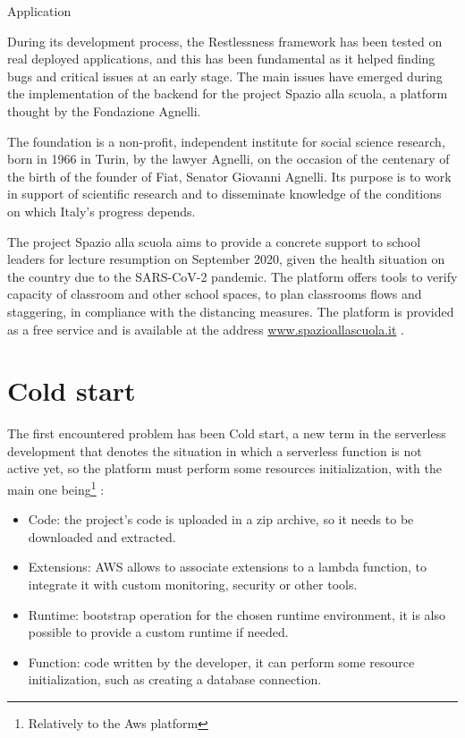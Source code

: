 \begin{chapter}{Application}
    \label{chap:application}

    During its development process, the Restlessness framework has been tested on
    real deployed applications, and this has been fundamental as it helped finding
    bugs and critical issues at an early stage.
    The main issues have emerged during the implementation of the backend for the
    project Spazio alla scuola, a platform thought by the Fondazione Agnelli.

    The foundation is a non-profit, independent institute for social science research,
    born in 1966 in Turin, by the lawyer Agnelli, on the occasion of the centenary
    of the birth of the founder of Fiat, Senator Giovanni Agnelli.
    Its purpose is to work in support of scientific research and to disseminate
    knowledge of the conditions on which Italy's progress depends.

    The project Spazio alla scuola aims to provide a concrete support to school
    leaders for lecture resumption on September 2020, given the health situation on the
    country due to the SARS-CoV-2 pandemic.
    The platform offers tools to verify capacity of classroom and other school spaces,
    to plan classrooms flows and staggering, in compliance with the distancing measures.
    The platform is provided as a free service and is available at the address
    \url{www.spazioallascuola.it} \cite{spazio_alla_scuola}.

    \section{Cold start}
    \label{subsec:cold_start}

    The first encountered problem has been Cold start, a new term in the serverless
    development that denotes the situation in which a serverless function is not
    active yet, so the platform must perform some resources initialization, with the
    main one being\footnote{Relatively to the Aws platform} \cite{aws_doc_runtimes}:

    \begin{itemize}
        \item Code: the project's code is uploaded in a zip archive, so it needs to
            be downloaded and extracted.
        \item Extensions: AWS allows to associate extensions to a lambda function, to
            integrate it with custom monitoring, security or other tools.
        \item Runtime: bootstrap operation for the chosen runtime environment,
            it is also possible to provide a custom runtime if needed.
        \item Function: code written by the developer, it can perform some resource
            initialization, such as creating a database connection.
    \end{itemize}


\end{chapter}

